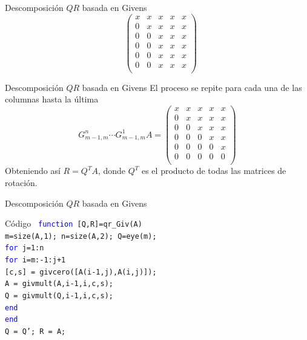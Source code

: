 \documentclass{beamer}
\begin{document}
\begin{frame}{Descomposici\'on $QR$ basada en Givens}
$$\begin{array}{r}
                                               \end{array}\left(\begin{array}{ccccc}
           x & x & x & x & x\\
           0 & x & x & x & x\\
           0 & 0 & x & x & x\\
           0 & 0 & x & x & x\\
           0 & 0 & x & x & x\\
           0 & 0 & x & x & x\\
          \end{array}\right)
  $$
  \end{frame}
  \begin{frame}{Descomposici\'on $QR$ basada en Givens}
  El proceso se repite para cada una de las columnas hasta la \'ultima
  $$
  G^n_{m-1,m}\cdots G^1_{m-1,m}A = \left(\begin{array}{ccccc}
           x & x & x & x & x\\
           0 & x & x & x & x\\
           0 & 0 & x & x & x\\
           0 & 0 & 0 & x & x\\
           0 & 0 & 0 & 0 & x\\
           0 & 0 & 0 & 0 & 0\\
          \end{array}\right)
  $$
  Obteniendo as\'i $R=Q^{T}A$, donde $Q^{T}$ es el producto de todas las matrices de rotaci\'on.
  \end{frame}
  \begin{frame}{Descomposici\'on $QR$ basada en Givens}
  \begin{block}{C\'odigo}
  \texttt{
  \hspace{-0.25cm}\textcolor{blue}{function} [Q,R]=qr\_Giv(A)\\
  m=size(A,1); n=size(A,2); Q=eye(m);\\
  \textcolor{blue}{for} j=1:n\\
  \hspace{0.25cm} \textcolor{blue}{for} i=m:-1:j+1\\
  \hspace{0.5cm} [c,s] = givcero([A(i-1,j),A(i,j)]);\\
  \hspace{0.5cm} A = givmult(A,i-1,i,c,s);\\
  \hspace{0.5cm} Q = givmult(Q,i-1,i,c,s);\\
  \hspace{0.25cm} \textcolor{blue}{end}\\
  \textcolor{blue}{end}\\
  Q = Q'; R = A;}
  \end{block}
  \end{frame}
\end{document}
